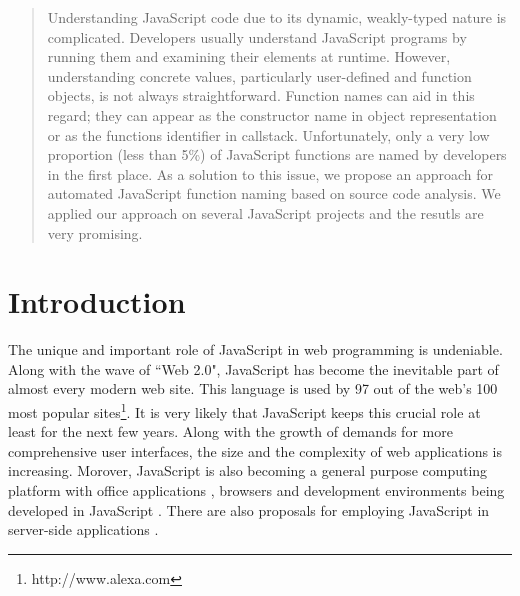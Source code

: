 \documentclass{acm_proc_article-sp}
\begin{document}
\maketitle
\begin{abstract}
Understanding JavaScript code due to its dynamic, weakly-typed nature is complicated. Developers usually understand JavaScript programs by running them and examining their elements at runtime. However, understanding concrete values, particularly user-defined and function objects, is not always straightforward. Function names can aid in this regard; they can appear as the constructor name in object representation or as the functions identifier in callstack. Unfortunately, only a very low proportion (less than 5\%) of JavaScript functions are named by developers in the first place. As a solution to this issue, we propose an approach for automated JavaScript function naming based on source code analysis. We applied our approach on several JavaScript projects and the resutls are very promising.

\end{abstract}




\section{Introduction}
The unique and important role of JavaScript in web programming is undeniable. Along with the wave of ``Web 2.0", JavaScript has become the inevitable part of almost every modern web site. This language is used by 97 out of the web's 100 most popular sites\footnote[1]{http://www.alexa.com}. It is very likely that JavaScript keeps this crucial role at least for the next few years. Along with the growth of demands for more comprehensive user interfaces, the size and the complexity of web applications is increasing. Morover, JavaScript is also becoming a general purpose computing platform with office applications \cite{JSOffice, JSOffice2}, browsers \cite{FAO, GCE} and development environments \cite{Ingalls} being developed in JavaScript \cite{Richards}. There are also proposals for employing JavaScript in server-side applications \cite{SSJSR, CJS}.
\end{document}
